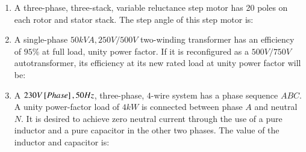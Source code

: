 \documentclass[journal]{IEEEtran}
\begin{document}
\begin{enumerate}
\begin{enumerate}
\end{enumerate}
\item A three-phase, three-stack, variable reluctance step motor has 20 poles on each rotor and stator stack. The step angle of this step motor is:
\begin{enumerate}
\end{enumerate}
\item A single-phase $50 kVA, 250 V/500 V$ two-winding transformer has an efficiency of $95\%$ at full load, unity power factor. If it is reconfigured as a $500 V/750 V$ autotransformer, its efficiency at its new rated load at unity power factor will be:
\begin{enumerate}
\end{enumerate}
\item A $230 V {}\left[Phase\right], 50 Hz$, three-phase, $4$-wire system has a phase sequence $ABC$. A unity power-factor load of $4 kW$ is connected between phase $A$ and neutral $N$. It is desired to achieve zero neutral current through the use of a pure inductor and a pure capacitor in the other two phases. The value of the inductor and capacitor is:

\end{enumerate}
\end{document}
